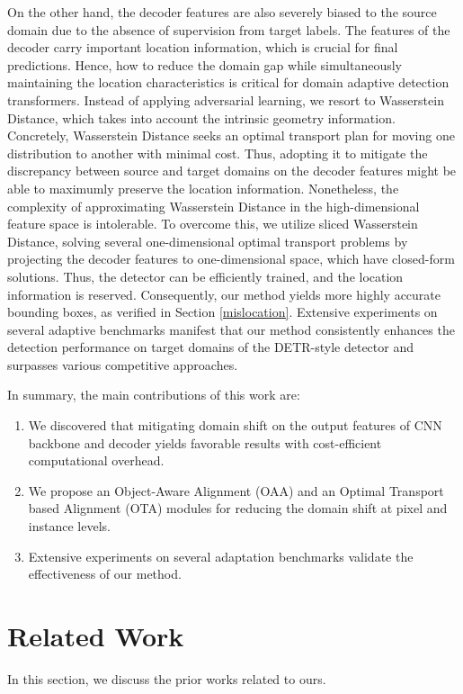 \documentclass[sigconf]{acmart}
\begin{document}
On the other hand, the decoder features are also severely biased to the source domain due to the absence of supervision from target labels. The features of the decoder carry important location information, which is crucial for final predictions. Hence, how to reduce the domain gap while simultaneously maintaining the location characteristics is critical for domain adaptive detection transformers. Instead of applying adversarial learning, we resort to Wasserstein Distance, which takes into account the intrinsic geometry information. Concretely, Wasserstein Distance seeks an optimal transport plan for moving one distribution to another with minimal cost. Thus, adopting it to mitigate the discrepancy between source and target domains on the decoder features might be able to maximumly preserve the location information. Nonetheless, the complexity of approximating Wasserstein Distance in the high-dimensional feature space is intolerable. To overcome this, we utilize sliced Wasserstein Distance, solving several one-dimensional optimal transport problems by projecting the decoder features to one-dimensional space, which have closed-form solutions. Thus, the detector can be efficiently trained, and the location information is reserved. Consequently, our method yields more highly accurate bounding boxes, as verified in Section \ref{mislocation}. Extensive experiments on several adaptive benchmarks manifest that our method consistently enhances the detection performance on target domains of the DETR-style detector and surpasses various competitive approaches.

In summary, the main contributions of this work are:
\begin{enumerate}
    \item We discovered that mitigating domain shift on the output features of CNN backbone and decoder yields favorable results with cost-efficient computational overhead.
  
    \item We propose an Object-Aware Alignment (OAA) and an Optimal Transport based Alignment (OTA) modules for reducing the domain shift at pixel and instance levels.
    \item Extensive experiments on several adaptation benchmarks validate the effectiveness of our method.
\end{enumerate}



 \section{Related Work}
In this section, we discuss the prior works related to ours. 
\end{document}
